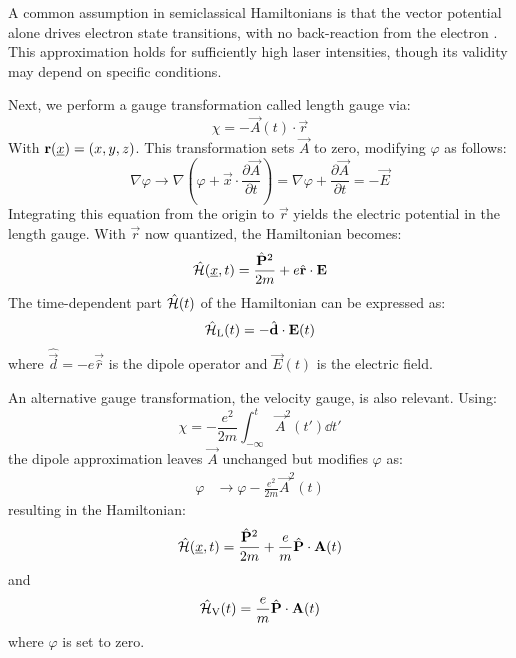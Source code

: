 A common assumption in semiclassical Hamiltonians is that the vector potential alone drives electron state transitions, with no back-reaction from the electron \cite{bosmandipoleapprox}. 
This approximation holds for sufficiently high laser intensities, though its validity may depend on specific conditions.%

Next, we perform a gauge transformation called length gauge via:
\begin{equation}
    \chi = -\vec{A}(t)\cdot \vec{r}
\end{equation}
With $\mathbf{r}(\underline{x})=(x,y,z)$.
This transformation sets $\vec{A}$ to zero, modifying $\varphi$ as follows:%
\begin{equation}
    \nabla \varphi \to \nabla (\varphi + \vec{x} \cdot \frac{\partial \vec{A}}{\partial t}) = \nabla \varphi + \frac{\partial \vec{A}}{\partial t} = - \vec{E}
\end{equation}
Integrating this equation from the origin to $\vec{r}$ yields the electric potential in the length gauge. %
With $\vec{r}$ now quantized, the Hamiltonian becomes:
\begin{equation*}%
    \hat{\Hs}(\uvec{x}, t) = \frac{\hat{\vec{P}}^2}{2m} + e \hat{\vec{r}} \cdot \vec{E}%
\end{equation*}
The time-dependent part $\hat{\mathcal{H}}(t)$ of the Hamiltonian can be expressed as:
\begin{equation}
    \hat{\mathcal{H}}_{\mathrm{L}}(t) = -\hat{\mathbf{d}} \cdot \mathbf{E}(t) \label{eq:dipoleApprox}
\end{equation}
where $\hat{\vec{d}}=-e\vec{\hat{r}}$ is the dipole operator and $\vec{E}(t)$ is the electric field.

An alternative gauge transformation, the velocity gauge, is also relevant. 
Using:
\begin{equation*}
    \chi = -\frac{e^2}{2m}\int_{-\infty}^{t} \vec{A}^2(t') \dd t'
\end{equation*}
the dipole approximation leaves $\vec{A}$ unchanged but modifies $\varphi$ as:
\begin{align*}
    \varphi &\to \varphi -\frac{e^2}{2m}\vec{A}^2(t)
\end{align*}
resulting in the Hamiltonian:
\begin{equation*}
    \hat{\mathcal{H}}(\underline{x}, t) = \frac{\hat{\mathbf{P}}^2}{2m} +\frac{e}{m}\hat{\mathbf{P}} \cdot \mathbf{A}(t)
\end{equation*}
and
\begin{equation}
    \hat{\mathcal{H}}_{\mathrm{V}}(t) = \frac{e}{m}\hat{\mathbf{P}} \cdot \mathbf{A}(t) \label{eq:dipoleApprox_velocity}
\end{equation}
where $\varphi$ is set to zero.


